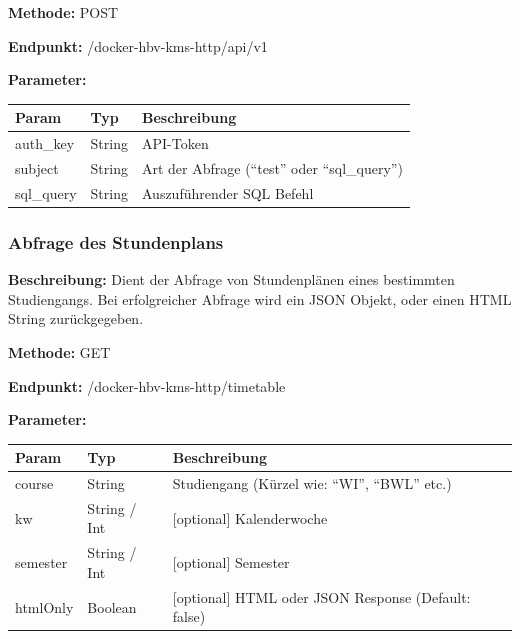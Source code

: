 \textbf{Methode:} POST

\textbf{Endpunkt:} /docker-hbv-kms-http/api/v1

\textbf{Parameter:}
\begin{table}[H]
    \label{table:/docker-hbv-kms-http/api/v1}
    \setlength{\tabcolsep}{3pt}
    \begin{tabular}{p{100pt}p{80pt}p{200pt}}
        \hline
        Param      & Typ    & Beschreibung                                   \\
        \hline
        auth\_key  & String & API-Token                                      \\
        subject    & String & Art der Abfrage (``test'' oder ``sql\_query'') \\
        sql\_query & String & Auszuführender SQL Befehl                      \\
        \hline
    \end{tabular}
\end{table}
\dotfill

\subsubsection{Abfrage des Stundenplans}
\label{sec:api-timetable}
\textbf{Beschreibung:} Dient der Abfrage von Stundenplänen eines bestimmten Studiengangs.
Bei erfolgreicher Abfrage wird ein JSON Objekt, oder einen HTML String zurückgegeben.

\textbf{Methode:} GET

\textbf{Endpunkt:} /docker-hbv-kms-http/timetable

\textbf{Parameter:}
\begin{table}[H]
    \label{table:/docker-hbv-kms-http/timetable}
    \setlength{\tabcolsep}{3pt}
    \begin{tabular}{p{100pt}p{80pt}p{200pt}}
        \hline
        Param    & Typ          & Beschreibung                                        \\
        \hline
        course   & String       & Studiengang (Kürzel wie: ``WI'', ``BWL'' etc.)      \\
        kw       & String / Int & [optional] Kalenderwoche                            \\
        semester & String / Int & [optional] Semester                                 \\
        htmlOnly & Boolean      & [optional] HTML oder JSON Response (Default: false) \\
        \hline
    \end{tabular}
\end{table}
\dotfill


